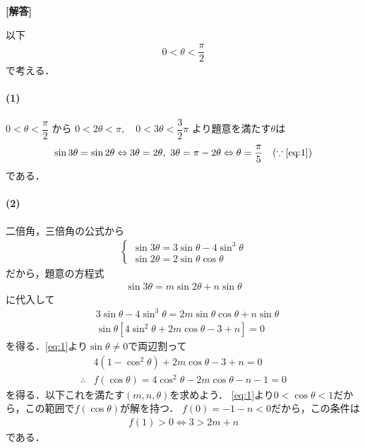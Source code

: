 \documentclass[../../main.tex]{subfiles}
\begin{document}
\begin{oframed}
  
\end{oframed}

{\bf [解答]}

以下
\begin{align}
  0 < \theta < \dfrac{\pi}{2} \label{eq:1}
\end{align}
で考える．

\paragraph{(1)}

$0 < \theta < \dfrac{\pi}{2}$ から $0 < 2\theta < \pi, \quad 0 < 3\theta < \dfrac{3}{2}\pi$ より題意を満たす$\theta$は
\begin{align}
  \sin 3\theta = \sin 2\theta
  \Leftrightarrow
  3\theta = 2\theta,\ 3\theta = \pi - 2\theta
  \Leftrightarrow
  \theta = \dfrac{\pi}{5} \quad (\because\text{\cref{eq:1}}) \label{eq:2}
\end{align}
である．

\paragraph{(2)}

二倍角，三倍角の公式から
\begin{align}
  \begin{cases}
    \sin 3\theta = 3\sin\theta - 4\sin^3\theta \\
    \sin 2\theta = 2\sin\theta\cos\theta
  \end{cases}
\end{align}
だから，題意の方程式
\begin{align}
  \sin 3\theta = m\sin 2\theta + n\sin\theta  \label{eq:3}
\end{align}
に代入して
\begin{align}
  & 3\sin\theta - 4\sin^3\theta = 2m\sin\theta\cos\theta + n\sin\theta \\
  & \sin\theta\left[4\sin^2\theta + 2m\cos\theta - 3 + n\right] = 0
\end{align}
を得る．\cref{eq:1}より$\sin \theta \neq 0$で両辺割って
\begin{align}
  & 4(1-\cos^2\theta) + 2m\cos\theta - 3 + n = 0 \\
  \therefore
  & f(\cos\theta) = 4\cos^2\theta - 2m\cos\theta - n -1 = 0 \label{eq:4}
\end{align}
を得る．以下これを満たす$(m,n,\theta)$を求めよう．
\cref{eq:1}より$0 < \cos\theta < 1$だから，この範囲で$f(\cos\theta)$が解を持つ．
$f(0)=-1-n<0$だから，この条件は
\begin{align}
  f(1)>0 \iff 3> 2m+n  \label{eq:5}
\end{align}
である．
\end{document}
